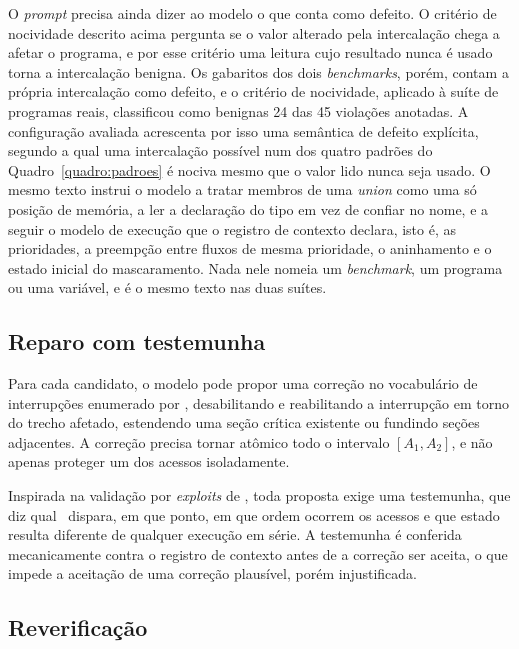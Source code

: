 O \textit{prompt} precisa ainda dizer ao modelo o que conta como defeito. O
critério de nocividade
descrito acima pergunta se o valor alterado pela intercalação chega a afetar o
programa, e por esse critério uma leitura cujo resultado nunca é usado torna a
intercalação benigna. Os gabaritos dos dois \textit{benchmarks}, porém, contam a
própria intercalação como defeito, e o critério de nocividade, aplicado à suíte
de programas reais, classificou como benignas 24 das 45 violações anotadas. A
configuração avaliada acrescenta por isso uma semântica de defeito explícita,
segundo a qual uma intercalação possível num dos quatro padrões do
Quadro~\ref{quadro:padroes} é nociva mesmo que o valor lido nunca seja usado.
O mesmo texto instrui o modelo a tratar membros de uma \textit{union} como uma
só posição de memória, a ler a declaração do tipo em vez de confiar no nome, e
a seguir o modelo de execução que o registro de contexto declara, isto é, as
prioridades, a preempção entre fluxos de mesma prioridade, o aninhamento e o
estado inicial do mascaramento. Nada nele nomeia um \textit{benchmark}, um
programa ou uma variável, e é o mesmo texto nas duas suítes.

\subsection{Reparo com testemunha}

Para cada candidato, o modelo pode propor uma correção no vocabulário de
interrupções enumerado por , desabilitando e reabilitando a
interrupção em torno do trecho afetado, estendendo uma seção crítica existente
ou fundindo seções adjacentes. A correção precisa tornar atômico todo o
intervalo $[A_1, A_2]$, e não apenas proteger um dos acessos isoladamente.

Inspirada na validação por \textit{exploits} de , toda
proposta exige uma testemunha, que diz qual \isr\ dispara, em que ponto, em que
ordem ocorrem os acessos e que estado resulta diferente de qualquer execução em
série. A testemunha é conferida mecanicamente contra o registro de contexto antes de a
correção ser aceita, o que impede a aceitação de uma correção plausível, porém
injustificada.

\subsection{Reverificação}

